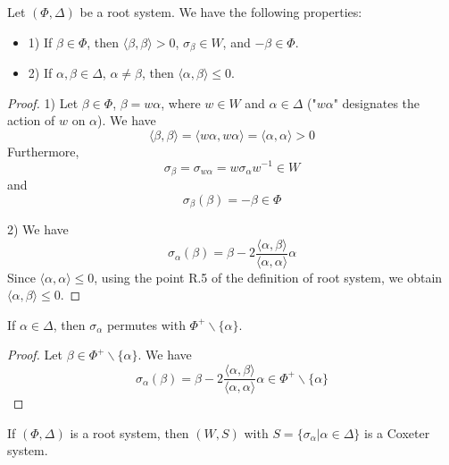 \documentclass[envcountsame,envcountchap]{svmono}
\begin{document}
\begin{proposition} 
Let $(\Phi, \Delta )$ be a root system. We have the following properties:
\begin{itemize}
\item 1) If $\beta \in \Phi$, then $\langle \beta, \beta \rangle > 0$, $\sigma_\beta \in W$, and $-\beta \in \Phi$. 
\item 2) If $\alpha, \beta \in \Delta$, $\alpha \neq \beta$, then $\langle \alpha, \beta \rangle \le 0$. 
\end{itemize} 
\end{proposition}
\begin{proof}
1) Let $\beta \in \Phi$, $\beta = w \alpha $, where $w \in W$ and $\alpha \in \Delta$ ("$w \alpha$" designates the action of $w$ on $\alpha$). We have
\begin{equation}
\langle \beta, \beta \rangle = \langle w \alpha, w \alpha \rangle = \langle \alpha , \alpha \rangle > 0
\end{equation} Furthermore,
\begin{equation}
\sigma_\beta = \sigma_{w \alpha} = w \sigma_\alpha w^{-1} \in W
\end{equation} and
\begin{equation}
\sigma_\beta(\beta) = - \beta \in \Phi
\end{equation}

2) We have
\begin{equation}
\sigma_\alpha (\beta ) = \beta - 2 \frac{\langle \alpha, \beta \rangle}{\langle \alpha , \alpha \rangle} \alpha
\end{equation} Since $\langle \alpha , \alpha \rangle \le 0$, using the point R.5 of the definition of root system, we obtain $\langle \alpha, \beta \rangle \le 0$. 


\end{proof}
	
\begin{lemma}
If $\alpha \in \Delta$, then $\sigma_\alpha$ permutes with $\Phi^+ \backslash \{ \alpha \}$. 
\end{lemma}	
\begin{proof}
Let $\beta \in \Phi^+ \backslash \{ \alpha \}$. We have
\begin{equation}
\sigma_\alpha (\beta ) = \beta - 2 \frac{\langle \alpha , \beta \rangle }{\langle \alpha, \alpha \rangle} \alpha \in \Phi^+ \backslash \{ \alpha \}
\end{equation}
\end{proof}

\begin{theorem}
If $(\Phi, \Delta)$ is a root system, then $(W, S)$ with $S = \{\sigma_\alpha | \alpha \in \Delta \}$ is a Coxeter system. 
\end{theorem}
\end{document}
